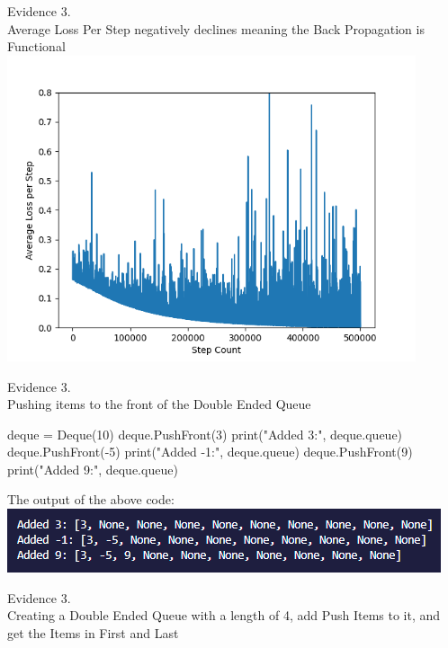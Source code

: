 \begin{center}
    {\large Evidence 3.\rn } \\ 
    \vspace{0.3cm}
    Average Loss Per Step negatively declines meaning the Back Propagation is Functional \\
    \includegraphics[width=12cm]{Images/Evaluation/RedWaterStaticExtra.png}
    \vspace{1cm}
    

    {\large Evidence 3.\rn } \\ 
    \vspace{0.3cm}
    Pushing items to the front of the Double Ended Queue \\

    \begin{pythoncode}
deque = Deque(10)
deque.PushFront(3)
print("Added 3:", deque.queue)
deque.PushFront(-5)
print("Added -1:", deque.queue)
deque.PushFront(9)
print("Added 9:", deque.queue)
    \end{pythoncode}
    
    The output of the above code: \\
    \includegraphics{Images/Testing/T3.8.1.PNG}
    \vspace{1cm}

    {\large Evidence 3.\rn } \\ 
    \vspace{0.3cm}
    Creating a Double Ended Queue with a length of 4, add Push Items to it, and get the 
    Items in First and Last \\


\end{center}
